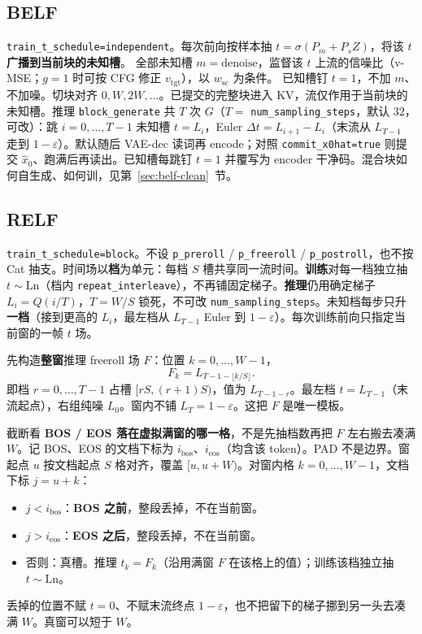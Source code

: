 \documentclass[UTF8,a4paper,11pt]{ctexart}
\begin{document}
\subsection{BELF}
\label{sec:belf-t}

\texttt{train\_t\_schedule=independent}。每次前向按样本抽 \(t=\sigma(P_m+P_s Z)\)，将该 \(t\) \textbf{广播到当前块的未知槽}。
全部未知槽 \(m=\mathrm{denoise}\)，监督该 \(t\) 上流的信噪比（v-MSE；\(g=1\) 时可按 CFG 修正 \(v_{\mathrm{tgt}}\)），以 \(w_{\mathrm{sc}}\) 为条件。
已知槽钉 \(t=1\)，不加 \(m\)、不加噪。切块对齐 \(0,W,2W,\ldots\)。已提交的完整块进入 KV，流仅作用于当前块的未知槽。推理 \texttt{block\_generate} 共 \(T\) 次 \(G\)（\(T=\) \texttt{num\_sampling\_steps}，默认 32，可改）：跳 \(i=0,\ldots,T-1\) 未知槽 \(t=L_i\)，Euler \(\Delta t=L_{i+1}-L_i\)（末流从 \(L_{T-1}\) 走到 \(1-\varepsilon\)）。默认随后 VAE-dec 读词再 encode；对照 \texttt{commit\_x0hat=true} 则提交 \(\hat x_0\)、跑满后再读出。已知槽每跳钉 \(t=1\) 并覆写为 encoder 干净码。混合块如何自生成、如何训，见第~\ref{sec:belf-clean}~节。

\subsection{RELF}
\label{sec:relf-t}

\texttt{train\_t\_schedule=block}。不设 \texttt{p\_preroll} / \texttt{p\_freeroll} / \texttt{p\_postroll}，也不按 Cat 抽支。时间场以\textbf{档}为单元：每档 \(S\) 槽共享同一流时间。\textbf{训练}对每一档独立抽 \(t\sim\mathrm{Ln}\)（档内 \texttt{repeat\_interleave}），不再铺固定梯子。\textbf{推理}仍用确定梯子 \(L_i=Q(i/T)\)，\(T=W/S\) 锁死，不可改 \texttt{num\_sampling\_steps}。未知档每步只升\textbf{一档}（接到更高的 \(L_i\)，最左档从 \(L_{T-1}\) Euler 到 \(1-\varepsilon\)）。每次训练前向只指定当前窗的一帧 \(t\) 场。

先构造\textbf{整窗}推理 freeroll 场 \(F\)：位置 \(k=0,\ldots,W-1\)，
\[
F_k = L_{T-1-\lfloor k/S\rfloor}.
\]
即档 \(r=0,\ldots,T-1\) 占槽 \([rS,(r+1)S)\)，值为 \(L_{T-1-r}\)。最左档 \(t=L_{T-1}\)（末流起点），右组纯噪 \(L_0\)。窗内不铺 \(L_T=1-\varepsilon\)。这把 \(F\) 是唯一模板。

截断看 \textbf{BOS / EOS 落在虚拟满窗的哪一格}，不是先抽档数再把 \(F\) 左右搬去凑满 \(W\)。记 BOS、EOS 的文档下标为 \(i_{\mathrm{bos}}\)、\(i_{\mathrm{eos}}\)（均含该 token）。PAD 不是边界。窗起点 \(u\) 按文档起点 \(S\) 格对齐，覆盖 \([u,u+W)\)。对窗内格 \(k=0,\ldots,W-1\)，文档下标 \(j=u+k\)：
\begin{itemize}
  \item \(j<i_{\mathrm{bos}}\)：\textbf{BOS 之前}，整段丢掉，不在当前窗。
  \item \(j>i_{\mathrm{eos}}\)：\textbf{EOS 之后}，整段丢掉，不在当前窗。
  \item 否则：真槽。推理 \(t_k=F_k\)（沿用满窗 \(F\) 在该格上的值）；训练该档独立抽 \(t\sim\mathrm{Ln}\)。
\end{itemize}
丢掉的位置不赋 \(t=0\)、不赋末流终点 \(1-\varepsilon\)，也不把留下的梯子挪到另一头去凑满 \(W\)。真窗可以短于 \(W\)。
\end{document}
